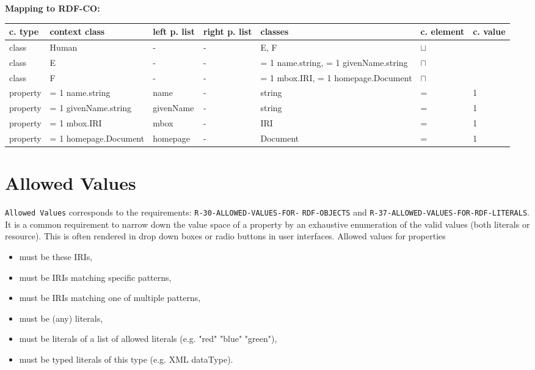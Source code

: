 \documentclass{llncs}
\newcommand{\ms}[1]{\texttt{#1}}
\newenvironment{gcotable}{
  \scriptsize
  \sffamily
  \vspace{0cm}
	\begin{center}
	\textbf{\vspace{0.4cm}Mapping to RDF-CO:} \\
  \begin{tabular}{l|l|l|l|l|l|l}
	\hline
  \textbf{c. type} & \textbf{context class} & \textbf{left p. list} & \textbf{right p. list} & \textbf{classes} & \textbf{c. element} & \textbf{c. value} \\
  \hline

}{
  \hline
  \end{tabular}
	\end{center}
}
\begin{document}
\begin{gcotable}
class & Human & - & - & E, F & $\sqcup$ \\
class & E & - & - & = 1 name.string, = 1 givenName.string & $\sqcap$ \\
class & F & - & - & = 1 mbox.IRI, = 1 homepage.Document & $\sqcap$ \\
property & = 1 name.string & name & - & string & = & 1 \\
property & = 1 givenName.string & givenName & - & string & = & 1 \\
property & = 1 mbox.IRI & mbox & - & IRI & = & 1 \\
property & = 1 homepage.Document & homepage & - & Document & = & 1 \\
\end{gcotable}

\section{Allowed Values}

\ms{Allowed Values} corresponds to the requirements:
\ms{R-30-ALLOWED-VALUES-FOR-} \ms{RDF-OBJECTS} and 
\ms{R-37-ALLOWED-VALUES-FOR-RDF-LITERALS}.
It is a common requirement to narrow down the value space of a property by an exhaustive enumeration of the valid values (both literals or resource). This is often rendered in drop down boxes or radio buttons in user interfaces. 
Allowed values for properties
\begin{itemize}
	\item must be these IRIs,
  \item must be IRIs matching specific patterns,
  \item must be IRIs matching one of multiple patterns,
  \item must be (any) literals,
  \item must be literals of a list of allowed literals (e.g. "red" "blue" "green"),
  \item must be typed literals of this type (e.g. XML dataType).
\end{itemize}
\end{document}
